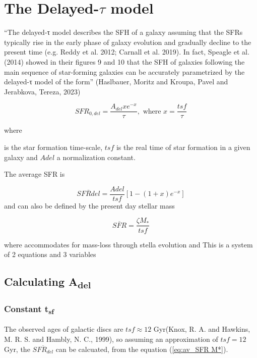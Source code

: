 \documentclass[a4paper]{article}
\begin{document}
\section{The Delayed-\(\tau\) model}
\label{sec:org0d51031}

``The delayed-τ model describes the SFH of a galaxy assuming that the SFRs typically rise in the early phase of galaxy evolution and gradually decline to the present time (e.g. Reddy et al. 2012; Carnall et al. 2019). In fact, Speagle et al. (2014) showed in their figures 9 and 10 that the SFH of galaxies following the main sequence of star-forming galaxies can be accurately parametrized by the delayed-τ model of the form'' (Haslbauer, Moritz and Kroupa, Pavel and Jerabkova, Tereza, 2023)


\begin{equation}
        \label{eq:SFR} SFR_{0,del}=\frac{A_{del}xe^{-x}}{\tau},\text{ where } x=\frac{tsf}{\tau}
\end{equation}

\noindent where

is the star formation time-scale, \(tsf\) is the real time of star formation in a given galaxy and \(Adel\) a normalization constant.

The average SFR is

\begin{equation}
        \label{eq:av_SFR-x} \overline{SFRdel}=\frac{Adel}{tsf}[1-(1+x)e^{-x}]
\end{equation}
and can also be defined by the present day stellar mass

\begin{equation}\label{eq:av_SFR M*}
        \overline{SFR}=\frac{\zeta M_*}{tsf}
\end{equation}

where
accommodates for mass-loss through stella evolution and This is a system of 2 equations and 3 variables

\subsection{Calculating A\textsubscript{del}}
\label{sec:orgb51a76e}

\subsubsection{Constant t\textsubscript{sf}}
\label{sec:org1f90dc5}
The observed ages of galactic discs are \(tsf≈ 12\) Gyr(Knox, R. A. and Hawkins, M. R. S. and Hambly, N. C., 1999), so assuming an approximation of \(tsf=12\) Gyr, the \(\overline{SFR_{del}}\) can be calcuated, from the equation (\ref{eq:av_SFR M*}).
\end{document}
